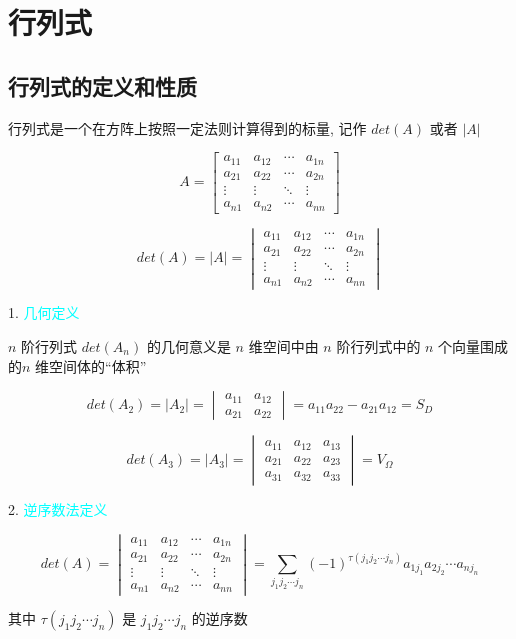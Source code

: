 
\chapter{行列式}
\section{行列式的定义和性质}
\begin{definition}[行列式]
	行列式是一个在方阵上按照一定法则计算得到的标量, 记作 $det(A)$ 或者 $|A|$

	$$A = \begin{bmatrix}
		a_{11} & a_{12} & \cdots & a_{1n}\\
		a_{21} & a_{22} & \cdots & a_{2n}\\
		\vdots & \vdots & \ddots & \vdots\\
		a_{n1} & a_{n2} & \cdots & a_{nn}
	\end{bmatrix}$$

	$$det(A) = |A| = \begin{vmatrix}
		a_{11} & a_{12} & \cdots & a_{1n}\\
		a_{21} & a_{22} & \cdots & a_{2n}\\
		\vdots & \vdots & \ddots & \vdots\\
		a_{n1} & a_{n2} & \cdots & a_{nn}
	\end{vmatrix}$$

1. \textcolor{cyan}{几何定义}

$n$ 阶行列式 $det(A_{n})$ 的几何意义是 $n$ 维空间中由 $n$ 阶行列式中的 $n$ 个向量围成的$n$ 维空间体的``体积''

$$ det(A_{2}) = |A_{2}| = 
\begin{vmatrix}
	a_{11} & a_{12}\\
	a_{21} & a_{22}
\end{vmatrix} = a_{11}a_{22} - a_{21}a_{12} = S_{D}$$

$$ det(A_{3}) =  |A_{3}| = 
\begin{vmatrix}
	a_{11} & a_{12} & a_{13}\\
	a_{21} & a_{22} & a_{23}\\
	a_{31} & a_{32} & a_{33}
\end{vmatrix} = V_{\Omega}$$

2. \textcolor{cyan}{逆序数法定义}


$$ det(A) = \begin{vmatrix}
	a_{11} & a_{12} & \cdots & a_{1n}\\
	a_{21} & a_{22} & \cdots & a_{2n}\\
	\vdots & \vdots & \ddots & \vdots\\
	a_{n1} & a_{n2} & \cdots & a_{nn}
\end{vmatrix} = 
\sum\limits_{j_{1}j_{2}\cdots j_{n}}(-1)^{\tau(j_{1}j_{2}\cdots j_{n})}a_{1 j_{1}}a_{2j_{2}}\cdots a_{n j_{n}}$$

其中 $\tau(j_{1}j_{2}\cdots j_{n})$ 是 $j_{1}j_{2}\cdots j_{n}$ 的逆序数
\end{definition}

